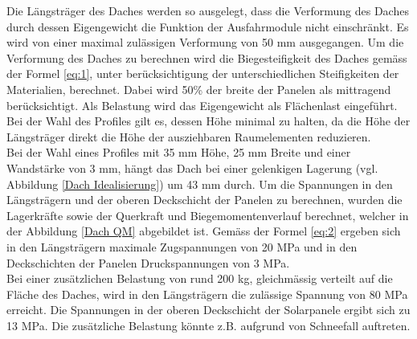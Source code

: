 Die Längsträger des Daches werden so ausgelegt, dass die Verformung des Daches durch dessen Eigengewicht die Funktion der Ausfahrmodule nicht einschränkt. Es wird von einer maximal zulässigen Verformung von 50 mm ausgegangen. Um die Verformung des Daches zu berechnen wird die Biegesteifigkeit des Daches gemäss der Formel \ref{eq:1}, unter berücksichtigung der unterschiedlichen Steifigkeiten der Materialien, berechnet. Dabei wird 50\% der breite der Panelen als mittragend berücksichtigt. Als Belastung wird das Eigengewicht als Flächenlast eingeführt. Bei der Wahl des Profiles gilt es, dessen Höhe minimal zu halten, da die Höhe der Längsträger direkt die Höhe der ausziehbaren Raumelementen reduzieren.\\
Bei der Wahl eines Profiles mit 35 mm Höhe, 25 mm Breite und einer Wandstärke von 3 mm, hängt das Dach bei einer gelenkigen Lagerung (vgl. Abbildung \ref{Dach Idealisierung}) um 43 mm durch. Um die Spannungen in den Längsträgern und der oberen Deckschicht der Panelen zu berechnen, wurden die Lagerkräfte sowie der Querkraft und Biegemomentenverlauf berechnet, welcher in der Abbildung \ref{Dach QM} abgebildet ist. Gemäss der Formel \ref{eq:2} ergeben sich in den Längsträgern maximale Zugspannungen von 20 MPa und in den Deckschichten der Panelen Druckspannungen von 3 MPa.\\
Bei einer zusätzlichen Belastung von rund 200 kg, gleichmässig verteilt auf die Fläche des Daches, wird in den Längsträgern die zulässige Spannung von 80 MPa erreicht. Die Spannungen in der oberen Deckschicht der Solarpanele ergibt sich zu 13 MPa. Die zusätzliche Belastung könnte z.B. aufgrund von Schneefall auftreten.

